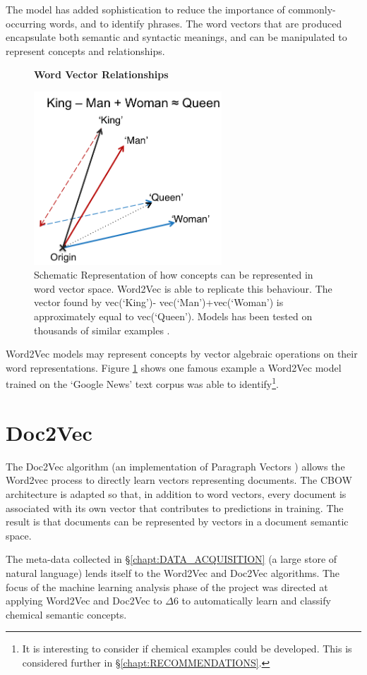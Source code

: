 The model has added sophistication to reduce the importance of commonly-occurring words, and to identify phrases. The word vectors that are produced encapsulate both semantic and syntactic meanings, and can be manipulated to represent concepts and relationships.
\begin{figure}[H]
    \centering
    \textbf{Word Vector Relationships}\par\medskip
    \includegraphics[height=6.5cm]{Natural_Language_Processing/KINGQUEEN.png}
    \caption[Word Vector Relationships]{Schematic Representation of how concepts can be represented in word vector space. Word2Vec is able to replicate this behaviour. The vector found by vec(‘King’)- vec(‘Man’)+vec(‘Woman’) is approximately equal to vec(‘Queen’). Models has been tested on thousands of similar examples \cite{word2vec2}\cite{word2veckingqueen}.}
     \label{fig:KINGQUEEN}
\end{figure}
Word2Vec models may represent concepts by vector algebraic operations on their word representations. Figure \ref{fig:KINGQUEEN} shows one famous example a Word2Vec model trained on the `Google News' text corpus was able to identify\footnote{It is interesting to consider if chemical examples could be developed. This is considered further in \S\ref{chapt:RECOMMENDATIONS}.}.

\section{Doc2Vec}
The Doc2Vec algorithm \cite{gensim} (an implementation of Paragraph Vectors \cite{doc2vec}) allows the Word2vec process to directly learn vectors representing documents. The CBOW architecture is adapted so that, in addition to word vectors, every document is associated with its own vector that contributes to predictions in training. The result is that documents can be represented by vectors in a document semantic space.

The meta-data collected in \S\ref{chapt:DATA_ACQUISITION} (a large store of natural language) lends itself to the Word2Vec and Doc2Vec algorithms. The focus of the machine learning analysis phase of the project was directed at applying Word2Vec and Doc2Vec to $\Delta6$ to automatically learn and classify chemical semantic concepts.